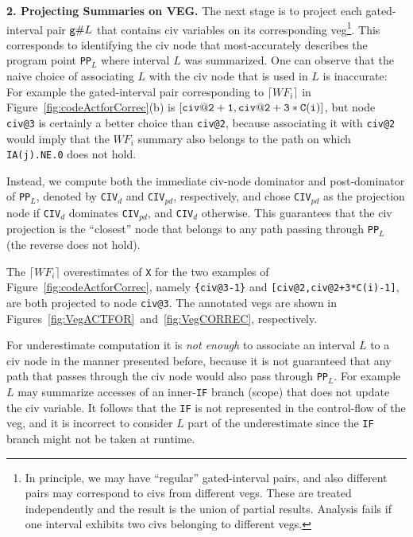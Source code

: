\documentclass{sig-alternate}
\begin{document}
\vspace{1ex}

{\bf 2. Projecting Summaries on VEG.}
The next stage is to project each gated-interval pair ${\tt g}\#L$ 
that contains {\sc civ} variables on its corresponding {\sc veg}\footnote{  
In principle, we may have ``regular'' gated-interval pairs, and also 
different pairs may correspond to {\sc civ}s from different {\sc veg}s. 
These are treated independently and the result is the union of partial results.
Analysis fails if one interval exhibits two {\sc civ}s belonging
to different {\sc veg}s.}. 
This corresponds to identifying the {\sc civ} node
that most-accurately describes the program point {\tt PP$_L$} 
where interval $L$ was summarized. 
One can observe that the naive choice of associating $L$ with the {\sc civ}
node that is used in $L$ is inaccurate: For example the gated-interval pair
corresponding to $\lceil WF_i \rceil$ in Figure~\ref{fig:codeActforCorrec}(b) 
is $[{\tt civ@2+1, civ@2+3*C(i)}]$, but node {\tt civ@3} 
is certainly a better choice than {\tt civ@2}, because associating
it with {\tt civ@2} would imply that the $WF_i$ summary also belongs 
to the path on which {\tt IA(j).NE.0} does not hold. 


Instead, we compute both the immediate {\sc civ}-node dominator and 
post-dominator of {\tt PP$_L$}, denoted by {\tt CIV}$_{d}$ and 
{\tt CIV}$_{pd}$, respectively, and chose {\tt CIV}$_{pd}$
as the projection node if {\tt CIV}$_{d}$ dominates {\tt CIV}$_{pd}$, 
and {\tt CIV}$_{d}$ otherwise. This guarantees that the {\sc civ} projection
is the ``closest'' node that belongs to any path passing through {\tt PP$_L$}
(the reverse does not hold).

The $\lceil WF_i\rceil$ overestimates of {\tt X} for the two 
examples of Figure~\ref{fig:codeActforCorrec}, namely
{\tt \{civ@3-1\}} and {\tt [civ@2,civ@2+3*C(i)-1]},
are both projected to node {\tt civ@3}. The annotated {\sc veg}s 
are shown in Figures~\ref{fig:VegACTFOR}~and~\ref{fig:VegCORREC}, respectively.
%

For underestimate computation it is {\em not enough} to associate an interval $L$ 
to a {\sc civ} node in the manner presented before, because it is not guaranteed
that any path that passes through the {\sc civ} node would also pass through {\tt PP$_L$}.
For example $L$ may summarize accesses of an inner-{\tt IF} branch 
(scope) that does not update the {\sc civ} variable. It follows that the {\tt IF} 
is not represented in the control-flow of the {\sc veg}, and it is incorrect
to consider $L$ part of the underestimate since the {\tt IF} branch might not be 
taken at runtime.
\end{document}
